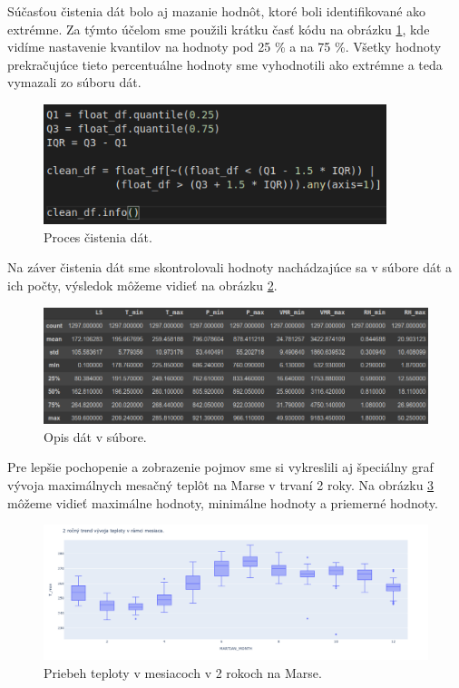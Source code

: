 \newpage
Súčasťou čistenia dát bolo aj mazanie hodnôt, ktoré boli identifikované ako extrémne. Za týmto účelom sme použili krátku časť kódu na obrázku \ref{cleandf}, kde vidíme nastavenie kvantilov na hodnoty pod 25 \% a na 75 \%. Všetky hodnoty prekračujúce tieto percentuálne hodnoty sme vyhodnotili ako extrémne a teda vymazali zo súboru dát.

\begin{figure}[!htbp]
  \centering
  \includegraphics[width=10cm]{img/clean_data.png}
  \caption{Proces čistenia dát.}
  \label{cleandf}
\end{figure}

Na záver čistenia dát sme skontrolovali hodnoty nachádzajúce sa v súbore dát a ich počty, výsledok môžeme vidieť na obrázku \ref{dfdesc}. 

\begin{figure}[!htbp]
  \centering
  \includegraphics[width=16cm]{img/df_desc.png}
  \caption{Opis dát v súbore.}
  \label{dfdesc}
\end{figure}

\newpage
Pre lepšie pochopenie a zobrazenie pojmov sme si vykreslili aj špeciálny graf vývoja maximálnych mesačný teplôt na Marse v trvaní 2 roky. Na obrázku \ref{bar_plot} môžeme vidieť maximálne hodnoty, minimálne hodnoty a priemerné hodnoty. 

\begin{figure}[!htbp]
  \centering
  \includegraphics[width=16cm]{img/monthly_temp.png}
  \caption{Priebeh teploty v mesiacoch v 2 rokoch na Marse.}
  \label{bar_plot}
\end{figure}


